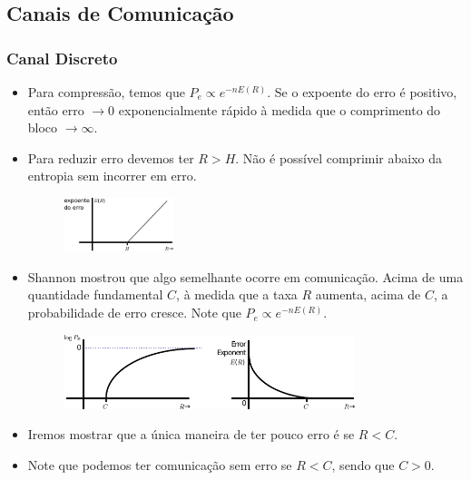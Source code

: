 \subsection{Canais de Comunicação}
\begin{frame}[allowframebreaks]
  \frametitle{Canal Discreto}

  \begin{itemize}
  \item Para compressão, temos que $P_e \propto e^{-nE(R)}$. Se o expoente do erro é positivo,
	então erro $\rightarrow 0$ exponencialmente rápido à medida que o comprimento do bloco $\rightarrow \infty$.
  \item Para reduzir erro devemos ter $R > H$. Não é possível comprimir abaixo da entropia sem incorrer em erro.

                \begin{figure}[h!]
                \centering
                \includegraphics[width=0.3\textwidth]{images/expoenteerro.pdf}
                \label{fig:expoenteerro}
                \end{figure}

  \item Shannon mostrou que algo semelhante ocorre em comunicação. Acima de uma quantidade fundamental $C$, à medida
	que a taxa $R$ aumenta, acima de $C$, a probabilidade de erro cresce. Note que $P_e \propto e^{-nE(R)}$. 

                \begin{figure}[h!]
                \centering
                \includegraphics[width=0.8\textwidth]{images/logPe.pdf}
                \label{fig:logPe}
                \end{figure}

  \item Iremos mostrar que a única maneira de ter pouco erro é se $R < C$.
  \item Note que podemos ter comunicação sem erro se $R < C$, sendo que $C > 0$.
  \end{itemize}
\end{frame}


